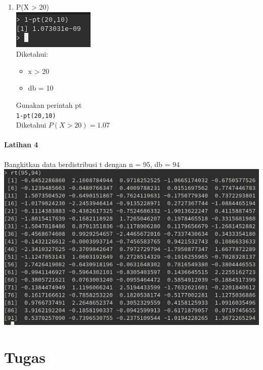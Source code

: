 \documentclass[a4paper,12pt]{article}
\begin{document}
\begin{enumerate}[label = \alph*.]
    \item P(X > 20)\\
        \includegraphics{lat3d}\\
        Diketahui:
        \begin{itemize}
            \item x > 20
            \item db = 10
        \end{itemize}
        Gunakan perintah pt\\
        \texttt{1-pt(20,10)}\\
        Diketahui $P(X > 20) = 1.07$

\end{enumerate}
\paragraph{Latihan 4\\}
Bangkitkan data berdistribusi t dengan n = 95, db = 94\\
\includegraphics[scale = .7]{lat4}\\

\section{Tugas}
\end{document}
